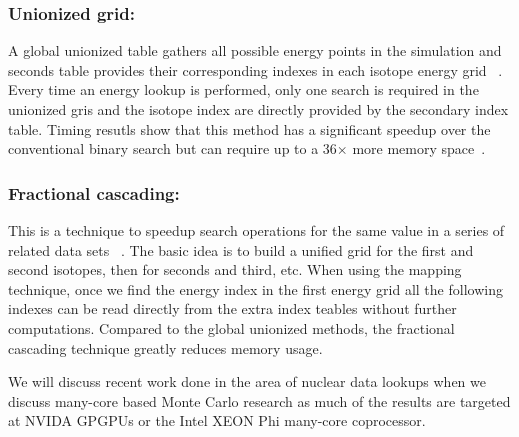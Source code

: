 \subsubsection*{ Unionized grid: } A global unionized table gathers all possible energy points in the simulation and seconds table provides their corresponding indexes in each isotope energy grid ~\cite{leppanen2009two}. Every time an energy lookup is performed, only one search is required in the unionized gris and the isotope index are directly provided by the secondary index table. Timing resutls show that this method has a significant speedup over the conventional binary search but can require up to a 36$\times$ more memory space~\cite{a.l.lunda.r.siegel2015}.
%
\subsubsection*{ Fractional cascading: } This is a technique to speedup search operations for the same value in a series of related data sets ~\cite{a.l.lunda.r.siegel2015}. The basic idea is to build a unified grid for the first and second isotopes, then for seconds and third, etc. When using the mapping technique, once we find the energy index in the first energy grid all the following indexes can be read directly from the extra index teables without further computations. Compared to the global unionized methods, the fractional cascading technique greatly reduces memory usage.

%
We will discuss recent work done in the area of nuclear data lookups when we discuss many-core based Monte Carlo research as much of the results are targeted at NVIDA GPGPUs or the Intel XEON Phi many-core coprocessor. 
